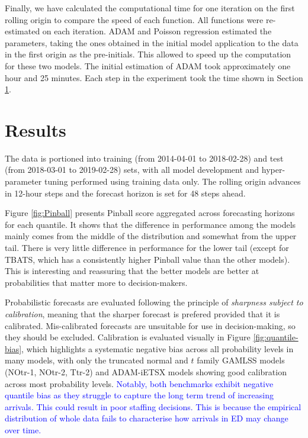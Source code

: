 \documentclass[]{elsarticle} %
\begin{document}
Finally, we have calculated the computational time for one iteration on
the first rolling origin to compare the speed of each function. All
functions were re-estimated on each iteration. ADAM and Poisson
regression estimated the parameters, taking the ones obtained in the
initial model application to the data in the first origin as the
pre-initials. This allowed to speed up the computation for these two
models. The initial estimation of ADAM took approximately one hour and
25 minutes. Each step in the experiment took the time shown in Section
\ref{result}.

\hypertarget{result}{%
\section{Results}\label{result}}

The data is portioned into training (from 2014-04-01 to 2018-02-28) and
test (from 2018-03-01 to 2019-02-28) sets, with all model development
and hyper-parameter tuning performed using training data only. The
rolling origin advances in 12-hour steps and the forecast horizon is set
for 48 steps ahead.

Figure \ref{fig:Pinball} presents Pinball score aggregated across
forecasting horizons for each quantile. It shows that the difference in
performance among the models mainly comes from the middle of the
distribution and somewhat from the upper tail. There is very little
difference in performance for the lower tail (except for TBATS, which
has a consistently higher Pinball value than the other models). This is
interesting and reassuring that the better models are better at
probabilities that matter more to decision-makers.

Probabilistic forecasts are evaluated following the principle of
\emph{sharpness subject to calibration}, meaning that the sharper forecast is
prefered provided that it is calibrated. Mis-calibrated forecasts are
unsuitable for use in decision-making, so they should be excluded.
Calibration is evaluated visually in Figure \ref{fig:quantile-bias},
which highlights a systematic negative bias across all probability
levels in many models, with only the truncated normal and \(t\) family
GAMLSS models (NOtr-1, NOtr-2, Ttr-2) and ADAM-iETSX models showing good
calibration across most probability levels. \textcolor{blue}{ Notably, both benchmarks
exhibit negative quantile bias as they struggle to capture the long term trend of increasing arrivals. This could result in poor staffing decisions. This is because the empirical distribution of whole data fails to characterise how arrivals in ED may change over time.}
\end{document}
